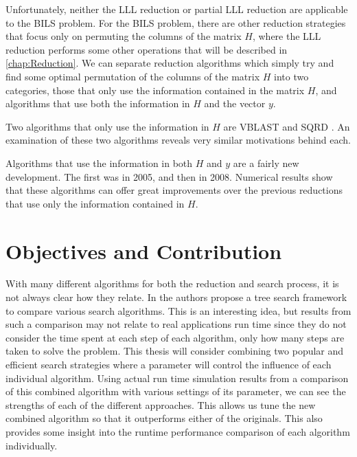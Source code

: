 \documentclass[12pt,Bold,letterpaper]{mcgilletdclass}
\newcommand{\vsp}{\vspace{\baselineskip}}
\begin{document}
Unfortunately, neither the LLL reduction or partial LLL reduction are applicable to the BILS problem. For the BILS problem, there are other reduction strategies that focus only on permuting the columns of the matrix $H$, where the LLL reduction performs some other operations that will be described in \ref{chap:Reduction}. We can separate reduction algorithms which simply try and find some optimal permutation of the columns of the matrix $H$ into two categories, those that only use the information contained in the matrix $H$, and algorithms that use both the information in $H$ and the vector $y$.

Two algorithms that only use the information in $H$ are VBLAST \cite{FosGVW99} and SQRD \cite{WubBRKK01}. An examination of these two algorithms reveals very similar motivations behind each.

Algorithms that use the information in both $H$ and $y$ are a fairly new development. The first was \cite{SuW05} in 2005, and then \cite{ChaH05} in 2008. Numerical results show that these algorithms can offer great improvements over the previous reductions that use only the information contained in $H$.

\vsp \section{Objectives and Contribution}
With many different algorithms for both the reduction and search process, it is not always clear how they relate. In \cite{MurGDC06} the authors propose a tree search framework to compare various search algorithms. This is an interesting idea, but results from such a comparison may not relate to real applications run time since they do not consider the time spent at each step of each algorithm, only how many steps are taken to solve the problem. This thesis will consider combining two popular and efficient search strategies where a parameter will control the influence of each individual algorithm. Using actual run time simulation results from a comparison of this combined algorithm with various settings of its parameter, we can see the strengths of each of the different approaches. This allows us tune the new combined algorithm so that it outperforms either of the originals. This also provides some insight into the runtime performance comparison of each algorithm individually.
\end{document}
